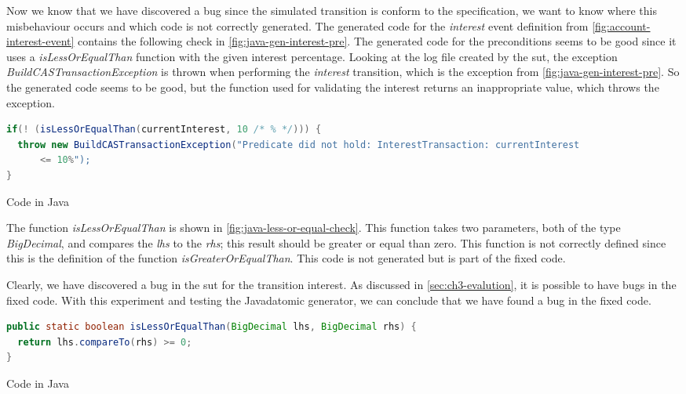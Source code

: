 Now we know that we have discovered a bug since the simulated transition is
conform to the specification, we want to know where this misbehaviour occurs and
which code is not correctly generated. The generated code for the \textit{interest} event
definition from \autoref{fig:account-interest-event} contains the following
check in \autoref{fig:java-gen-interest-pre}. The generated code for the
preconditions seems to be good since it uses a \textit{isLessOrEqualThan}
function with the given interest percentage. Looking at the log file created by
the \gls{sut}, the exception \textit{BuildCASTransactionException} is thrown when
performing the \textit{interest} transition, which is the exception from
\autoref{fig:java-gen-interest-pre}. So the generated code seems to be good, but
the function used for validating the interest returns an inappropriate value,
which throws the exception.

\begin{sourcecode}[h!]
\begin{lstlisting}[language=Java]
if(! (isLessOrEqualThan(currentInterest, 10 /* % */))) {
  throw new BuildCASTransactionException("Predicate did not hold: InterestTransaction: currentInterest
	  <= 10%");
}
\end{lstlisting}
\caption{Code in Java}\label{fig:java-gen-interest-pre}
\end{sourcecode}
\FloatBarrier

The function \textit{isLessOrEqualThan} is shown in
\autoref{fig:java-less-or-equal-check}. This function takes two parameters, both
of the type \textit{BigDecimal}, and compares the \textit{lhs} to the
\textit{rhs}; this result should be greater or equal than zero. This function
is not correctly defined since this is the definition of the function
\textit{isGreaterOrEqualThan}. This code is not generated but is part of the
fixed code.

Clearly, we have discovered a bug in the \gls{sut} for the transition
interest. As discussed in \autoref{sec:ch3-evalution}, it is possible to have
bugs in the fixed code. With this experiment and testing the Javadatomic
generator, we can conclude that we have found a bug in the fixed code.

\begin{sourcecode}[h!]
\begin{lstlisting}[language=Java]
public static boolean isLessOrEqualThan(BigDecimal lhs, BigDecimal rhs) {
  return lhs.compareTo(rhs) >= 0;
}
\end{lstlisting}
\caption{Code in Java}\label{fig:java-less-or-equal-check}
\end{sourcecode}
\FloatBarrier


